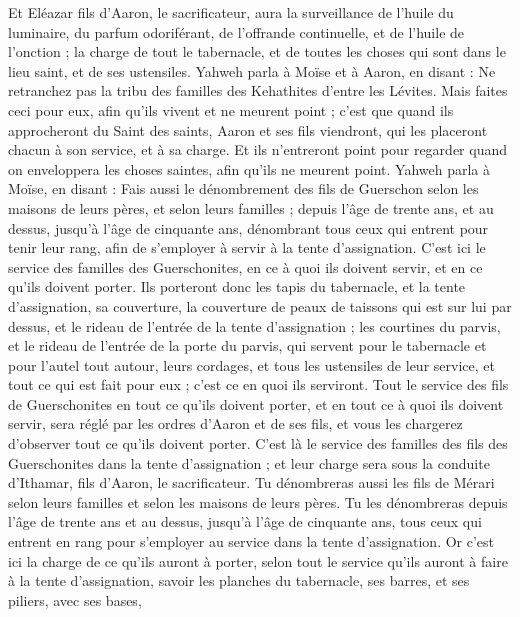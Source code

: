 \begin{multicols}{2}
Et Eléazar fils d'Aaron, le sacrificateur, aura la surveillance de l'huile du luminaire, du parfum odoriférant, de l'offrande continuelle, et de l'huile de l'onction ; la charge de tout le tabernacle, et de toutes les choses qui sont dans le lieu saint, et de ses ustensiles.
Yahweh parla à Moïse et à Aaron, en disant :
Ne retranchez pas la tribu des familles des Kehathites d'entre les Lévites.
Mais faites ceci pour eux, afin qu'ils vivent et ne meurent point ; c'est que quand ils approcheront du Saint des saints, Aaron et ses fils viendront, qui les placeront chacun à son service, et à sa charge.
Et ils n'entreront point pour regarder quand on enveloppera les choses saintes, afin qu'ils ne meurent point.
Yahweh parla à Moïse, en disant :
Fais aussi le dénombrement des fils de Guerschon selon les maisons de leurs pères, et selon leurs familles ;
depuis l'âge de trente ans, et au dessus, jusqu'à l'âge de cinquante ans, dénombrant tous ceux qui entrent pour tenir leur rang, afin de s'employer à servir à la tente d'assignation.
C'est ici le service des familles des Guerschonites, en ce à quoi ils doivent servir, et en ce qu'ils doivent porter.
Ils porteront donc les tapis du tabernacle, et la tente d'assignation, sa couverture, la couverture de peaux de taissons qui est sur lui par dessus, et le rideau de l'entrée de la tente d'assignation ;
les courtines du parvis, et le rideau de l'entrée de la porte du parvis, qui servent pour le tabernacle et pour l'autel tout autour, leurs cordages, et tous les ustensiles de leur service, et tout ce qui est fait pour eux ; c'est ce en quoi ils serviront.
Tout le service des fils de Guerschonites en tout ce qu'ils doivent porter, et en tout ce à quoi ils doivent servir, sera réglé par les ordres d'Aaron et de ses fils, et vous les chargerez d'observer tout ce qu'ils doivent porter.
C'est là le service des familles des fils des Guerschonites dans la tente d'assignation ; et leur charge sera sous la conduite d'Ithamar, fils d'Aaron, le sacrificateur.
Tu dénombreras aussi les fils de Mérari selon leurs familles et selon les maisons de leurs pères.
Tu les dénombreras depuis l'âge de trente ans et au dessus, jusqu'à l'âge de cinquante ans, tous ceux qui entrent en rang pour s'employer au service dans la tente d'assignation.
Or c'est ici la charge de ce qu'ils auront à porter, selon tout le service qu'ils auront à faire à la tente d'assignation, savoir les planches du tabernacle, ses barres, et ses piliers, avec ses bases,

\end{multicols}
